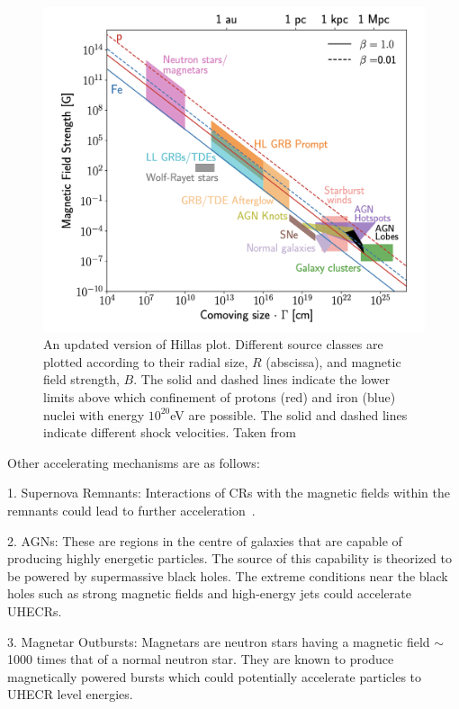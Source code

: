 \begin{figure}[t!]
  \centering
  \includegraphics[width=14.5cm]{thesis_figures/CRnNu/Hillas_modified.png}
  \caption{An updated version of Hillas plot. Different source classes are plotted according to their radial size, $R$ (abscissa), and magnetic field strength, $B$. The solid and dashed lines indicate the lower limits above which confinement of protons (red) and iron (blue) nuclei with energy $10^{20}$eV are possible. The solid and dashed lines indicate different shock velocities. Taken from~\cite{AlvesBatista:2019tlv}}
  \label{fig:Hillas_modified}
\end{figure}


Other accelerating mechanisms are as follows:

1. Supernova Remnants:  Interactions of \glspl{CR} with the magnetic fields within the remnants could lead to further acceleration~\cite{BLASI_2011}.

2. \glspl{AGN}: These are regions in the centre of galaxies that are capable of producing highly energetic particles. The source of this capability is theorized to be powered by supermassive black holes. The extreme conditions near the black holes such as strong magnetic fields and high-energy jets could accelerate \glspl{UHECR}.~\cite{Rieger_2022}

3. Magnetar Outbursts: Magnetars are neutron stars having a magnetic field $\sim$1000 times that of a normal neutron star. They are known to produce magnetically powered bursts which could potentially accelerate particles to \gls{UHECR} level energies.~\cite{PhysRevD.84.023002}

